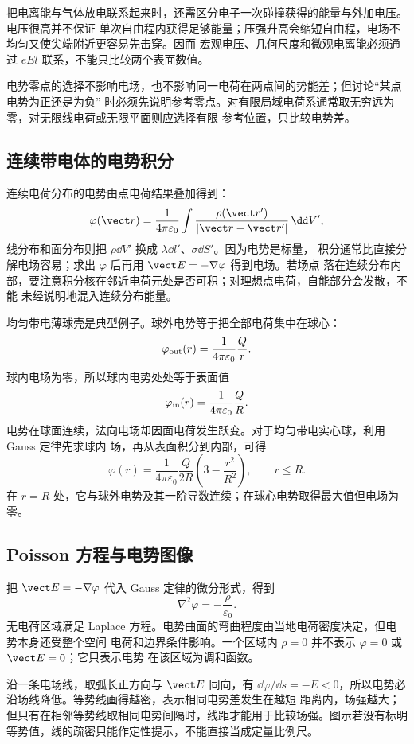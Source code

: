 把电离能与气体放电联系起来时，还需区分电子一次碰撞获得的能量与外加电压。电压很高并不保证
单次自由程内获得足够能量；压强升高会缩短自由程，电场不均匀又使尖端附近更容易先击穿。因而
宏观电压、几何尺度和微观电离能必须通过 $eEl$ 联系，不能只比较两个表面数值。

电势零点的选择不影响电场，也不影响同一电荷在两点间的势能差；但讨论“某点电势为正还是为负”
时必须先说明参考零点。对有限局域电荷系通常取无穷远为零，对无限线电荷或无限平面则应选择有限
参考位置，只比较电势差。

\subsection*{连续带电体的电势积分}

连续电荷分布的电势由点电荷结果叠加得到：
\[
 \varphi(\vect r)=\frac1{4\pi\varepsilon_0}
 \int\frac{\rho(\vect r')}{|\vect r-\vect r'|}\,\dd V',
\]
线分布和面分布则把 $\rho\dd V'$ 换成 $\lambda\dd l'$、$\sigma\dd S'$。因为电势是标量，
积分通常比直接分解电场容易；求出 $\varphi$ 后再用 $\vect E=-\nabla\varphi$ 得到电场。若场点
落在连续分布内部，要注意积分核在邻近电荷元处是否可积；对理想点电荷，自能部分会发散，不能
未经说明地混入连续分布能量。

均匀带电薄球壳是典型例子。球外电势等于把全部电荷集中在球心：
\[
 \varphi_{\rm out}(r)=\frac1{4\pi\varepsilon_0}\frac Qr.
\]
球内电场为零，所以球内电势处处等于表面值
\[
 \varphi_{\rm in}(r)=\frac1{4\pi\varepsilon_0}\frac QR.
\]
电势在球面连续，法向电场却因面电荷发生跃变。对于均匀带电实心球，利用 Gauss 定律先求球内
场，再从表面积分到内部，可得
\[
 \varphi(r)=\frac1{4\pi\varepsilon_0}\frac{Q}{2R}
 \left(3-\frac{r^2}{R^2}\right),\qquad r\le R.
\]
在 $r=R$ 处，它与球外电势及其一阶导数连续；在球心电势取得最大值但电场为零。

\subsection*{Poisson 方程与电势图像}

把 $\vect E=-\nabla\varphi$ 代入 Gauss 定律的微分形式，得到
\[
 \boxed{\nabla^2\varphi=-\frac{\rho}{\varepsilon_0}}.
\]
无电荷区域满足 Laplace 方程。电势曲面的弯曲程度由当地电荷密度决定，但电势本身还受整个空间
电荷和边界条件影响。一个区域内 $\rho=0$ 并不表示 $\varphi=0$ 或 $\vect E=0$；它只表示电势
在该区域为调和函数。

沿一条电场线，取弧长正方向与 $\vect E$ 同向，有
$\dd\varphi/\dd s=-E<0$，所以电势必沿场线降低。等势线画得越密，表示相同电势差发生在越短
距离内，场强越大；但只有在相邻等势线取相同电势间隔时，线距才能用于比较场强。图示若没有标明
等势值，线的疏密只能作定性提示，不能直接当成定量比例尺。
